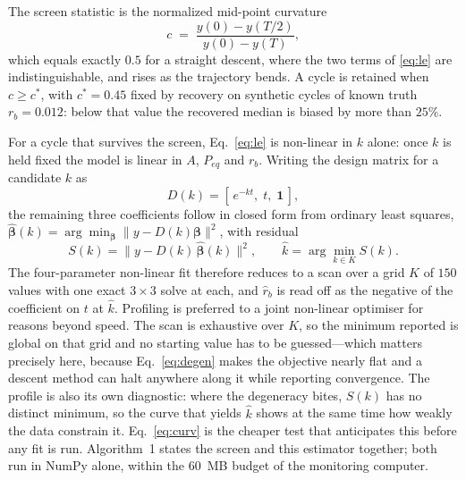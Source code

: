 \documentclass[runningheads]{llncs}
\newcommand{\rb}{\ensuremath{r_{b}}}
\newcommand{\rbh}{\ensuremath{\hat{r}_{b}}}
\begin{document}
The screen statistic is the normalized mid-point curvature
\begin{equation}
c \;=\; \frac{y(0)-y(T/2)}{y(0)-y(T)} ,
\label{eq:curv}
\end{equation}
which equals exactly $0.5$ for a straight descent, where the two terms
of \eqref{eq:le} are indistinguishable, and rises as the trajectory
bends. A cycle is retained when $c \ge c^{*}$, with $c^{*}=0.45$ fixed
by recovery on synthetic cycles of known truth $\rb=0.012$: below that
value the recovered median is biased by more than $25\%$.

For a cycle that survives the screen, Eq.~\eqref{eq:le} is non-linear
in $k$ alone: once $k$ is held fixed the model is linear in $A$,
$P_{eq}$ and \rb{}. Writing the design matrix for a candidate $k$ as
\begin{equation}
D(k)=\left[\,e^{-kt},\; t,\; \mathbf{1}\,\right] ,
\label{eq:design}
\end{equation}
the remaining three coefficients follow in closed form from ordinary
least squares, $\hat{\boldsymbol\beta}(k)=\arg\min_{\boldsymbol\beta}
\lVert y-D(k)\boldsymbol\beta\rVert^{2}$, with residual
\begin{equation}
S(k)=\bigl\lVert y-D(k)\,\hat{\boldsymbol\beta}(k)\bigr\rVert^{2} ,
\qquad
\hat{k}=\arg\min_{k\in K} S(k) .
\label{eq:profile}
\end{equation}
The four-parameter non-linear fit therefore reduces to a scan over a
grid $K$ of $150$ values with one exact $3\times3$ solve at each,
and \rbh{} is read off as the negative of the coefficient on $t$ at
$\hat{k}$. Profiling is preferred to a joint non-linear optimiser for
reasons beyond speed. The scan is exhaustive over $K$, so the minimum
reported is global on that grid and no starting value has to be
guessed---which matters precisely here, because
Eq.~\eqref{eq:degen} makes the objective nearly flat and a descent
method can halt anywhere along it while reporting convergence. The
profile is also its own diagnostic: where the degeneracy bites, $S(k)$
has no distinct minimum, so the curve that yields $\hat{k}$ shows at
the same time how weakly the data constrain it.
Eq.~\eqref{eq:curv} is the cheaper test that anticipates this before
any fit is run. Algorithm~1 states the screen and this estimator together;
both run in NumPy alone, within the $60$~MB budget of the monitoring
computer.
\end{document}
